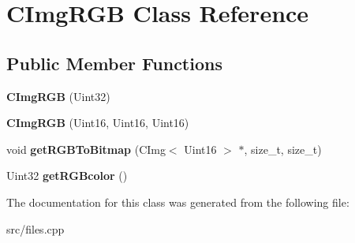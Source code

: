 \hypertarget{classCImgRGB}{}\section{C\+Img\+R\+GB Class Reference}
\label{classCImgRGB}
\subsection*{Public Member Functions}
\begin{DoxyCompactItemize}
\item 
\mbox{\label{classCImgRGB_a78cf187bf51913891e7a3c52a6565daf}} 
{\bfseries C\+Img\+R\+GB} (Uint32)
\item 
\mbox{\label{classCImgRGB_adad45a809450fd829faf7919864c79d2}} 
{\bfseries C\+Img\+R\+GB} (Uint16, Uint16, Uint16)
\item 
\mbox{\label{classCImgRGB_a6cdf0f4d89bb475b5beebecad74bc828}} 
void {\bfseries get\+R\+G\+B\+To\+Bitmap} (C\+Img$<$ Uint16 $>$ $\ast$, size\+\_\+t, size\+\_\+t)
\item 
\mbox{\label{classCImgRGB_ac1c1e3908595c3804bd2cd421b1d0fce}} 
Uint32 {\bfseries get\+R\+G\+Bcolor} ()
\end{DoxyCompactItemize}


The documentation for this class was generated from the following file\+:\begin{DoxyCompactItemize}
\item 
src/files.\+cpp\end{DoxyCompactItemize}
